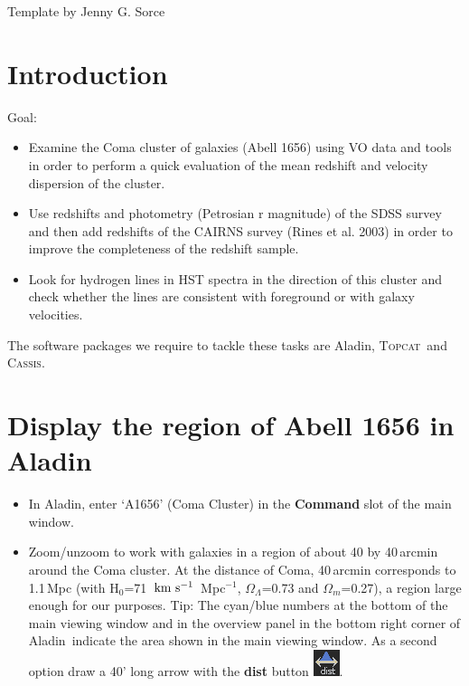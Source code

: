 \documentclass [a4paper, 12pt]{article}
\def\kms{\rm km\ s^{-1}}
\newcommand{\aladin}{{\textsc{A}{ladin}}}
\newcommand{\topcat}{{\textsc{Topcat}}}
\newcommand{\cassis}{{\textsc{Cassis}}}
\begin{document}
\vspace{3.5cm}
Template by Jenny G. Sorce


\newpage
\normalsize
\vfill
\tableofcontents
\vfill

\newpage

\justify
\section{Introduction}

Goal: 
\begin{itemize}
\item  Examine the Coma cluster of galaxies (Abell 1656) using VO data and tools in order to perform a quick evaluation of the mean redshift and velocity dispersion of the cluster. 
\item Use redshifts and photometry (Petrosian r magnitude) of the SDSS survey and then add redshifts of the CAIRNS survey (Rines et al. 2003) in order to improve the completeness of the redshift sample. 
\item Look for hydrogen lines in HST spectra in the direction of this cluster and check whether the lines are consistent with foreground or with galaxy velocities.\\
\end{itemize}
\noindent The software packages we require to tackle these tasks are \aladin, 
\topcat\ and \cassis.

\section{Display the region of Abell 1656 in \aladin}

\begin{itemize}
\item In \aladin, enter `A1656' (Coma Cluster) in the \textbf{Command} slot of 
the main window.
\item Zoom/unzoom to work with galaxies in a region of about 40 by 40\,arcmin 
around the Coma cluster. At the distance of Coma, 40\,arcmin corresponds to 
1.1\,Mpc (with H$_0$=71~$\kms$~Mpc$^{-1}$, $\Omega_\Lambda$=0.73 and 
$\Omega_m$=0.27), a region large enough for our purposes. Tip: 
The cyan/blue numbers at the bottom of the main viewing window and in the 
overview panel in the bottom right corner of \aladin\ indicate the area shown 
in the main viewing window. As a second option draw a 40' long arrow with the 
\textbf{dist} button \includegraphics[width=0.03  
\textwidth]{../images/aladin_button_distance.png}. 
\end{itemize}
\end{document}
